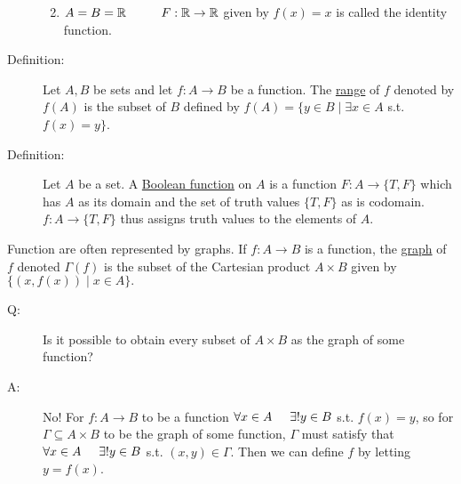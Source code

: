 \documentclass[10pt]{article}
\begin{document}
\begin{description}
\begin{enumerate}
\begin{figure}[h]
			\end{figure}
			\item $A=B=\mathbb{R} \hspace{10mm} F:\mathbb{R} \rightarrow \mathbb{R}$ given by $f(x)=x$ is called the identity function.
		\end{enumerate}
		\item[Definition:] Let $A, B$ be sets and let $f: A \rightarrow B$ be a function. The \underline{range} of $f$ denoted by $f(A)$ is the subset of $B$ defined by $f(A) = \{y \in B \mid \exists x \in A$ s.t. $f(x)=y \}$.
		\item[Definition:] Let $A$ be a set. A \underline{Boolean function} on $A$ is a function $F:A \rightarrow \{T, F\}$ which has $A$ as its domain and the set of truth values $\{T, F\}$ as is codomain. $f:A \rightarrow \{T, F\}$ thus assigns truth values to the elements of $A$.
	\end{description}
	Function are often represented by graphs. If $f:A \rightarrow B$ is a function, the \underline{graph} of $f$ denoted $\Gamma (f)$ is the subset of the Cartesian product $A \times B$ given by $\{(x, f(x)) \mid x \in A \}.$
	\begin{description}
		\item[Q:] Is it possible to obtain every subset of $A \times B$ as the graph of some function?
		\item[A:] No! For $f:A \rightarrow B$ to be a function $\forall x \in A \hspace{5mm} \exists! y \in B$ s.t. $f(x)=y$, so for $\Gamma \subseteq A \times B$ to be the graph of some function, $\Gamma$ must satisfy that $\forall x \in A \hspace{5mm} \exists! y \in B$ s.t. $(x, y) \in \Gamma$. Then we can define $f$ by letting $y = f(x)$.
	\end{description}
	
\end{document}
